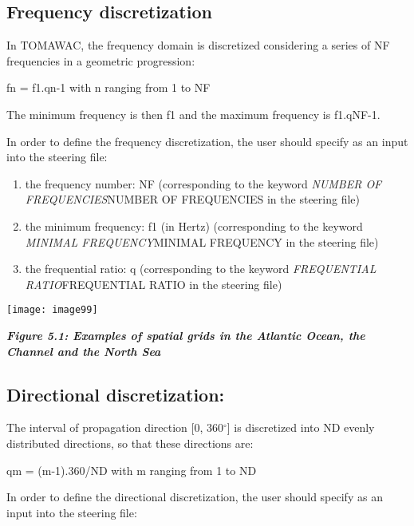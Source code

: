 \subsection{ Frequency discretization}

 In TOMAWAC, the frequency domain is discretized considering a series of NF frequencies in a geometric progression:

   fn = f1.qn-1  with n ranging from 1 to NF

 The minimum frequency is then f1 and the maximum frequency is f1.qNF-1.

In order to define the frequency discretization, the user should specify as an input into the steering file:

\begin{enumerate}
\item  the frequency number: NF (corresponding to the keyword \textit{NUMBER OF FREQUENCIES}NUMBER OF FREQUENCIES\textit{ }in the steering file)

\item  the minimum frequency: f1 (in Hertz) (corresponding to the keyword \textit{MINIMAL FREQUENCY}MINIMAL FREQUENCY\textit{ }in the steering file)

\item  the frequential ratio: q (corresponding to the keyword \textit{FREQUENTIAL RATIO}FREQUENTIAL RATIO\textit{ }in the steering file)
\end{enumerate}

  \texttt{[image: image99]}

 \textbf{\textit{Figure 5.1: Examples of spatial grids in the Atlantic Ocean, the Channel and the North Sea}}


\subsection{  Directional discretization:}

 The interval of propagation direction [0, 360${}^\circ$] is discretized into ND evenly distributed directions, so that these directions are:

 qm = (m-1).360/ND   with m ranging from 1 to ND

 In order to define the directional discretization, the user should specify as an input into the steering file:

